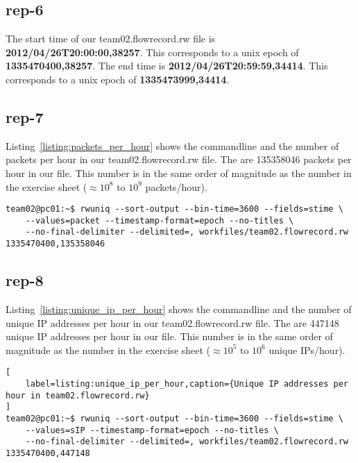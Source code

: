 \documentclass{article}
\begin{document}
\subsection{rep-6}

The start time of our team02.flowrecord.rw file is \textbf{2012/04/26T20:00:00,38257}. This corresponds to
a unix epoch of \textbf{1335470400,38257}. The end time is \textbf{2012/04/26T20:59:59,34414}. This corresponds
to a unix epoch of \textbf{1335473999,34414}.

\subsection{rep-7}

Listing~\ref{listing:packets_per_hour} shows the commandline and the number of packets per hour in our
team02.flowrecord.rw file.
The are 135358046 packets per hour in our file. This number is in the
same order of magnitude as the number in the exercise sheet ($\approx 10^8 \text{ to } 10^9$ packets/hour).

\begin{lstlisting}[label=listing:packets_per_hour,caption={Number of packets per hour in team02.flowrecord.rw}]
team02@pc01:~$ rwuniq --sort-output --bin-time=3600 --fields=stime \
    --values=packet --timestamp-format=epoch --no-titles \
    --no-final-delimiter --delimited=, workfiles/team02.flowrecord.rw
1335470400,135358046
\end{lstlisting}

\subsection{rep-8}

Listing~\ref{listing:unique_ip_per_hour} shows the commandline and the number of unique IP addresses per hour in
our team02.flowrecord.rw file.
The are 447148 unique IP addresses per hour in our file. This number is in the
same order of magnitude as the number in the exercise sheet ($\approx 10^5 \text{ to } 10^6$ unique IPs/hour).

\begin{lstlisting}[
    label=listing:unique_ip_per_hour,caption={Unique IP addresses per hour in team02.flowrecord.rw}
]
team02@pc01:~$ rwuniq --sort-output --bin-time=3600 --fields=stime \
    --values=sIP --timestamp-format=epoch --no-titles \
    --no-final-delimiter --delimited=, workfiles/team02.flowrecord.rw
1335470400,447148
\end{lstlisting}
\end{document}
